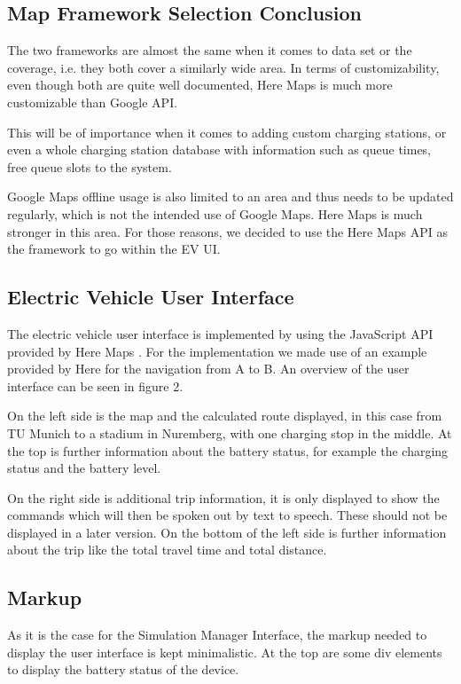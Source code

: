 \subsection{Map Framework Selection Conclusion}

The two frameworks are almost the same when it comes to data set or the coverage, i.e. they both cover a similarly wide area. In terms of customizability, even though both are quite well documented, Here Maps is much more customizable than Google API.

This will be of importance when it comes to adding custom charging stations, or even a whole charging station database with information such as queue times, free queue slots to the system.

Google Maps offline usage is also limited to an area and thus needs to be updated regularly, which is not the intended use of Google Maps. Here Maps is much stronger in this area. For those reasons, we decided to use the Here Maps API as the framework to go within the EV UI.  


\subsection{Electric Vehicle User Interface}

The electric vehicle user interface is implemented by using the JavaScript API provided by Here Maps \cite{driver-15} \cite{driver-16}. For the implementation we made use of an example provided by Here for the navigation from A to B. An overview of the user interface can be seen in figure 2. 

On the left side is the map and the calculated route displayed, in this case from TU Munich to a stadium in Nuremberg, with one charging stop in the middle. At the top is further information about the battery status, for example the charging status and the battery level.

On the right side is additional trip information, it is only displayed to show the commands which will then be spoken out by text to speech. These should not be displayed in a later version. On the bottom of the left side is further information about the trip like the total travel time and total distance. 


\subsection{Markup}

As it is the case for the Simulation Manager Interface, the markup needed to display the user interface is kept minimalistic. At the top are some div elements to display the battery status of the device.

